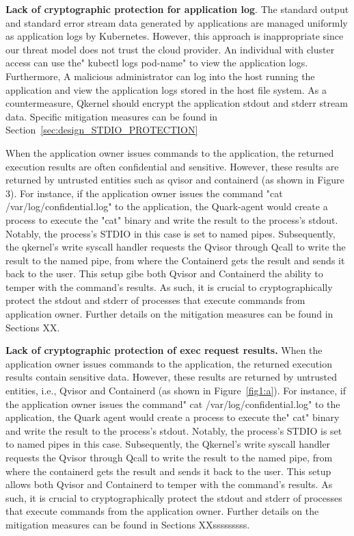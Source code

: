 \textbf{Lack of cryptographic protection for application log}. The standard output and standard error stream data generated by applications are managed uniformly as application logs by Kubernetes. However, this approach is inappropriate since our 
threat model does not trust the cloud provider. An individual with cluster access can use the" kubectl logs pod-name" to view the application logs. Furthermore, A malicious administrator can log into the host running the application and view the 
application logs stored in the host file system. As a countermeasure, Qkernel should encrypt the application stdout and stderr stream data. Specific mitigation measures can be found in Section~\ref{sec:design_STDIO_PROTECTION}


 When the application owner issues commands to the application, the returned execution results are often confidential and sensitive. However, these results are returned by untrusted entities 
such as qvisor and containerd (as shown in Figure 3). For instance, if the application owner issues the command "cat /var/log/confidential.log" to the application, the Quark-agent would create a process to execute the "cat" binary and write the 
result to the process's stdout. Notably, the process’s STDIO in this case is set to named pipes. Subsequently, the qkernel's write syscall handler requests the Qvisor through Qcall to write the result to the named pipe, from where the Containerd 
gets the result and sends it back to the user. This setup gibe both Qvisor and Containerd the ability to temper with the command's results. As such, it is crucial to cryptographically protect the stdout and stderr of processes that execute commands 
from application owner. Further details on the mitigation measures can be found in Sections XX.

\textbf{Lack of cryptographic protection of exec request results.} When the application owner issues commands to the application, the returned execution results contain sensitive data. However, these results are returned by untrusted entities, i.e., 
Qvisor and Containerd (as shown in Figure~\ref{fig1:a}).   For instance, if the application owner issues the command" cat /var/log/confidential.log" to the application, the Quark agent would create a process to execute the" cat" binary and write the 
result to the process's stdout. Notably, the process's STDIO is set to named pipes in this case. Subsequently, the Qkernel's write syscall handler requests the Qvisor through Qcall to write the result to the named pipe, from where the containerd 
gets the result and sends it back to the user. This setup allows both Qvisor and Containerd to temper with the command's results. As such, it is crucial to cryptographically protect the stdout and stderr of processes that execute commands from the 
application owner. Further details on the mitigation measures can be found in Sections XXsssssssss.


